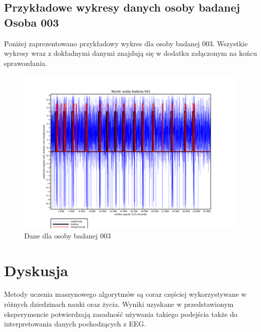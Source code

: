 \documentclass{article}
\begin{document}
        \subsection{Przykładowe wykresy danych osoby badanej \\Osoba 003}

            Poniżej zaprezentowano przykładowy wykres dla osoby badanej 003.
            \newline
            Wszystkie wykresy wraz z dokładnymi danymi znajdują się w dodatku załączonym na końcu sprawozdania.
            
            \begin{figure}[H]
                \hspace*{-4.5cm} 
                \includegraphics[width=\linewidth+10cm]{../plotting_data/scilab_eeg_01_sub_003.pdf}
                \caption{Dane dla osoby badanej 003}
            \end{figure}
            





    \newpage
    \section{Dyskusja}
        Metody uczenia maszynowego algorytmów są coraz częściej wykorzystywane w różnych dziedzinach nauki oraz życia. Wyniki uzyskane w przedstawionym eksperymencie potwierdzają zasadność używania takiego podejścia także do interpretowania danych pochodzących z EEG. 
        
\end{document}
